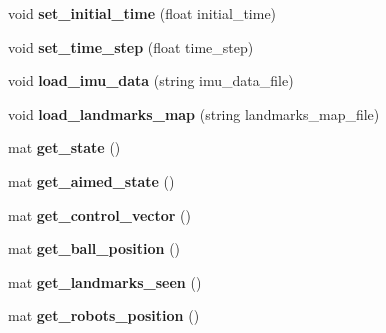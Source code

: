 \begin{DoxyCompactItemize}
\item 
\mbox{\label{class_robot_navigation_ad4127e6135f10fefffd0524e5cf224e3}} 
void {\bfseries set\+\_\+initial\+\_\+time} (float initial\+\_\+time)
\item 
\mbox{\label{class_robot_navigation_a5f47abc9fd8fe81c2d4df33cd732a84a}} 
void {\bfseries set\+\_\+time\+\_\+step} (float time\+\_\+step)
\item 
\mbox{\label{class_robot_navigation_af1ec4d21b09907e7c849ab603a173484}} 
void {\bfseries load\+\_\+imu\+\_\+data} (string imu\+\_\+data\+\_\+file)
\item 
\mbox{\label{class_robot_navigation_af936fdf445213270848a4fc881d1cdb7}} 
void {\bfseries load\+\_\+landmarks\+\_\+map} (string landmarks\+\_\+map\+\_\+file)
\item 
\mbox{\label{class_robot_navigation_a3ecd5c2f6f316b4b41b48cb0c28a944e}} 
mat {\bfseries get\+\_\+state} ()
\item 
\mbox{\label{class_robot_navigation_aa56d5bc1153358167a4ea2521050a0b9}} 
mat {\bfseries get\+\_\+aimed\+\_\+state} ()
\item 
\mbox{\label{class_robot_navigation_a825a8172dc71450817593b0dcd6c6dc2}} 
mat {\bfseries get\+\_\+control\+\_\+vector} ()
\item 
\mbox{\label{class_robot_navigation_ab04ff3cecd3441e13588f1a2c78f4e2c}} 
mat {\bfseries get\+\_\+ball\+\_\+position} ()
\item 
\mbox{\label{class_robot_navigation_acc50daa5ac82e2900f87d2b312afc518}} 
mat {\bfseries get\+\_\+landmarks\+\_\+seen} ()
\item 
\mbox{\label{class_robot_navigation_a9082eefeea50d92c1cf1ea07620733c3}} 
mat {\bfseries get\+\_\+robots\+\_\+position} ()
\item 
\mbox{\label{class_robot_navigation_a63b9ea0c29057b9be47cccff6010eb8b}} 

\end{DoxyCompactItemize}

